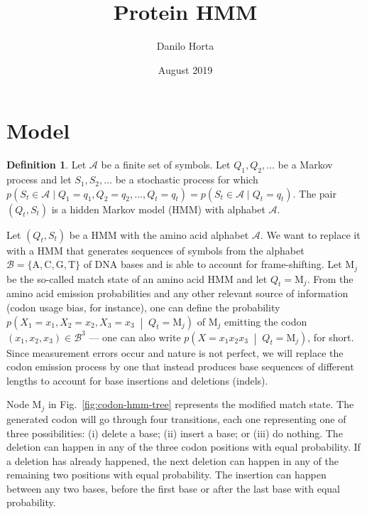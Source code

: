 \documentclass[a4paper]{article}
\title{Protein HMM}
\author{Danilo Horta}
\date{August 2019}
\theoremstyle{definition}
\theoremstyle{definition}
\newtheorem{definition}{Definition}[section]
\theoremstyle{definition}
\newcommand{\cprob}[2]{p\left(#1\;\middle|\; #2\right)}
\newcommand{\gv}{\;|\;}
\begin{document}
\maketitle

\section{Model}

\begin{definition}\label{def:hmm}
Let $\mathcal A$ be a finite set of symbols.
Let $Q_1, Q_2, \dots$ be a Markov process and let $S_1, S_2, \dots$ be a stochastic process for which
$p(S_t\in\mathcal A\gv Q_1=q_1, Q_2=q_2, \dots, Q_t=q_t) = p(S_t\in\mathcal A\gv Q_t=q_t)$.
The pair $(Q_t, S_t)$ is a hidden Markov model (HMM) with alphabet $\mathcal A$.
\end{definition}

Let $(Q_t, S_t)$ be a HMM with the amino acid alphabet $\mathcal A$.
We want to replace it with a HMM that generates sequences of symbols from the alphabet
$\mathcal B = \{\mathrm A, \mathrm C, \mathrm G, \mathrm T\}$ of DNA bases and is able to account
for frame-shifting.
Let $\mathrm M_j$ be the so-called match state of an amino acid HMM and let $Q_t=\mathrm M_j$.
From the amino acid emission probabilities and any other relevant source of information
(codon usage bias, for instance), one can define the probability $\cprob{X_1=x_1, X_2=x_2, X_3=x_3}{Q_t=\mathrm M_j}$
of $\mathrm M_j$ emitting the codon $(x_1, x_2, x_3) \in \mathcal B^3$
--- one can also write $\cprob{X=x_1x_2x_3}{Q_t=\mathrm M_j}$, for short.
Since measurement errors occur and nature is not perfect, we will replace the
codon emission process by one that instead produces base sequences of different
lengths to account for base insertions and deletions (indels).

Node $\mathrm M_j$ in Fig.~\ref{fig:codon-hmm-tree} represents the modified match state.
The generated codon will go through four transitions, each one representing one of three possibilities: (i) delete a base; (ii) insert a base; or (iii) do nothing.
The deletion can happen in any of the three codon positions with equal probability.
If a deletion has already happened, the next deletion can happen in any of the remaining two positions with equal probability.
The insertion can happen between any two bases, before the first base or after the last base with equal probability.
\end{document}
